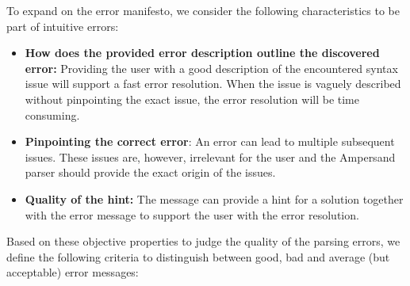 \noindent
To expand on the error manifesto, we consider the following characteristics to be part of intuitive errors:
\begin{itemize}
  \item	\textbf{\small How does the provided error description outline the discovered error:}
      Providing the user with a good description of the encountered syntax issue will support a fast error resolution.
      When the issue is vaguely described without pinpointing the exact issue, the error resolution will be time consuming.
  \item	\textbf{\small Pinpointing the correct error}:
      An error can lead to multiple subsequent issues.
      These issues are, however, irrelevant for the user and the Ampersand parser should provide the exact origin of the issues.
  \item	\textbf{\small Quality of the hint:}
    The message can provide a hint for a solution together with the error message to support the user with the error resolution.
\end {itemize}
%
Based on these objective properties to judge the quality of the parsing errors, we define the following criteria to distinguish between good, bad and average (but acceptable) error messages:
%
%

